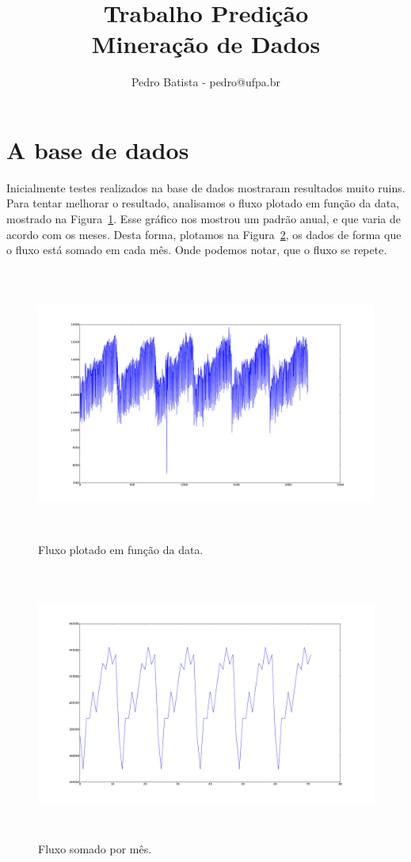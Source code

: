 \documentclass{article}
\title{Trabalho Predição\\
   Mineração de Dados}
\author{Pedro Batista - pedro@ufpa.br}
\begin{document}
\maketitle

\section{A base de dados}
Inicialmente testes realizados na base de dados mostraram resultados muito ruins.
Para tentar melhorar o resultado, analisamos o fluxo plotado em função da data,
mostrado na Figura~\ref{fig:data}. Esse gráfico nos mostrou um padrão anual, e
que varia de acordo com os meses. Desta forma, plotamos na Figura~\ref{fig:fluxo_mes},
os dados de forma que o fluxo está somado em cada mês. Onde podemos notar, que o fluxo
se repete.

\begin{figure}[h]
   \centering
   \includegraphics[height=9cm]{fluxo_data}
   \caption{Fluxo plotado em função da data.}
   \label{fig:data}
\end{figure}

\begin{figure}[h]
   \centering
   \includegraphics[height=9cm]{fluxo_mes}
   \caption{Fluxo somado por mês.}
   \label{fig:fluxo_mes}
\end{figure}
\end{document}

